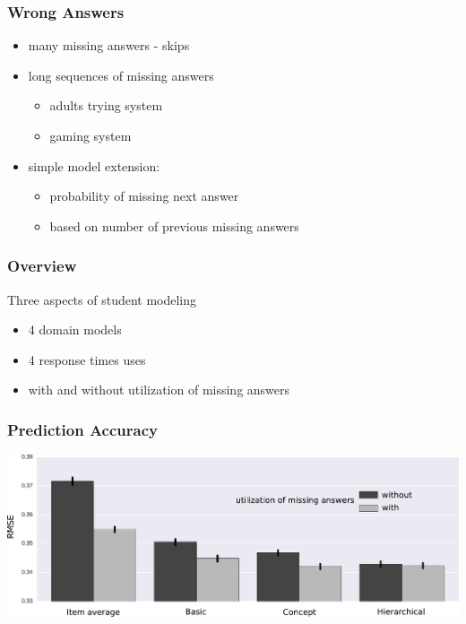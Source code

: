 \documentclass[xcolor=svgnames]{beamer}
\begin{document}
\begin{frame}
    \frametitle{Wrong Answers}

    \begin{itemize}
        \item many missing answers - skips
        \item long sequences of missing answers
        \begin{itemize}
            \item adults trying system
            \item gaming system
        \end{itemize}
        \item simple model extension:
        \begin{itemize}
            \item probability of missing next answer
            \item based on number of previous missing answers
        \end{itemize}
    \end{itemize}
\end{frame}
\begin{frame}
    \frametitle{Overview}

    Three aspects of student modeling
    \begin{itemize}
        \item 4 domain models
        \item 4 response times uses
        \item with and without utilization of missing answers
    \end{itemize}

\end{frame}
\begin{frame}
    \frametitle{Prediction Accuracy}

    \includegraphics[width=\linewidth]{figures/missing-answers}
\end{frame}
\end{document}
